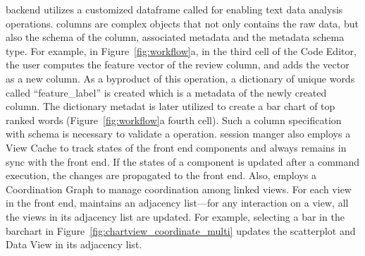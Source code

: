 \system backend utilizes a customized dataframe called \vitaframe for enabling text data analysis~\cite{rahman2020leam} operations. \vitaframe columns are complex objects that not only contains the raw data, but also the schema of the column, associated metadata and the metadata schema type. For example,
in Figure~\ref{fig:workflow}a, in the third cell of the Code Editor, the user computes the  feature vector of the review column, and adds the vector as a new column. As a byproduct of this operation, a dictionary of unique words called ``feature\_label'' is created which is a metadata of the newly created column. The dictionary metadat is later utilized to create a bar chart of top ranked words (Figure~\ref{fig:workflow}a fourth cell).
Such a column specification with schema is necessary to validate a \vta operation. \system session manger also employs a View Cache to track states of the front end components and always remains in sync with the front end. If the states of a component is updated after a \vital command execution, the changes are propagated to the front end. Also, \system employs a Coordination Graph to manage coordination among linked views. For each view in the front end, \system maintains an adjacency list---for any interaction on a view, all the views in its adjacency list are updated. For example, selecting a bar in the barchart in Figure~\ref{fig:chartview_coordinate_multi} updates the scatterplot and Data View in its adjacency list.

